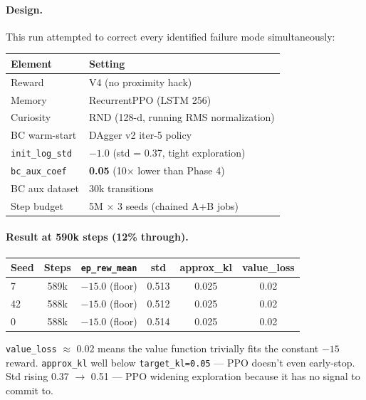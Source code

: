 \documentclass[11pt,letterpaper]{article}
\begin{document}
\paragraph{Design.}
This run attempted to correct every identified failure mode simultaneously:

\begin{table}[H]
\centering
\begin{tabular}{ll}
\toprule
\textbf{Element} & \textbf{Setting} \\
\midrule
Reward & V4 (no proximity hack) \\
Memory & RecurrentPPO (LSTM 256) \\
Curiosity & RND (128-d, running RMS normalization) \\
BC warm-start & DAgger v2 iter-5 policy \\
\texttt{init\_log\_std} & $-1.0$ (std = 0.37, tight exploration) \\
\texttt{bc\_aux\_coef} & \textbf{0.05} (10$\times$ lower than Phase 4) \\
BC aux dataset & 30k transitions \\
Step budget & 5M $\times$ 3 seeds (chained A+B jobs) \\
\bottomrule
\end{tabular}
\end{table}

\paragraph{Result at 590k steps (12\% through).}

\begin{table}[H]
\centering
\begin{tabular}{lccccc}
\toprule
\textbf{Seed} & \textbf{Steps} & \textbf{\texttt{ep\_rew\_mean}} & \textbf{std}
& \textbf{approx\_kl} & \textbf{value\_loss} \\
\midrule
7  & 589k & $-15.0$ (floor) & 0.513 & 0.025 & 0.02 \\
42 & 588k & $-15.0$ (floor) & 0.512 & 0.025 & 0.02 \\
0  & 588k & $-15.0$ (floor) & 0.514 & 0.025 & 0.02 \\
\bottomrule
\end{tabular}
\end{table}

\texttt{value\_loss} $\approx$ 0.02 means the value function trivially fits
the constant $-15$ reward. \texttt{approx\_kl} well below \texttt{target\_kl=0.05}
— PPO doesn't even early-stop. Std rising 0.37 $\to$ 0.51 — PPO widening
exploration because it has no signal to commit to.
\end{document}
